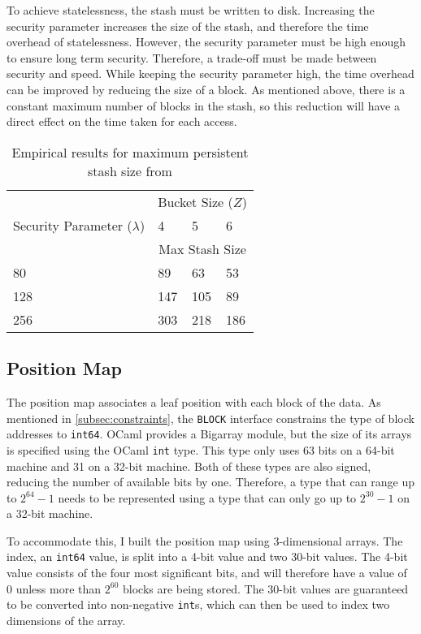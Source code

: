 \documentclass[12pt,a4paper,twoside,openright]{report}
\begin{document}
To achieve statelessness, the stash must be written to disk. Increasing the security parameter increases the size of the stash, and therefore the time overhead of statelessness. However, the security parameter must be high enough to ensure long term security. Therefore, a trade-off must be made between security and speed. While keeping the security parameter high, the time overhead can be improved by reducing the size of a block. As mentioned above, there is a constant maximum number of blocks in the stash, so this reduction will have a direct effect on the time taken for each access.

\begin{table}
\centering
\begin{tabular}{|l|l|l|l|}
    \hline
    & \multicolumn{3}{c|}{Bucket Size ($Z$)} \\
    \cline{2-4}
    Security Parameter ($\lambda$) & 4 & 5 & 6 \\
    \cline{2-4}
    & \multicolumn{3}{c|}{Max Stash Size} \\
    \hline
    80 & 89 & 63 & 53 \\
    \hline
    128 & 147 & 105 & 89 \\
    \hline
    256 & 303 & 218 & 186 \\
    \hline
\end{tabular}
\caption{Empirical results for maximum persistent stash size from \citet{stefanov2013path}}
\label{tab:stashsizes}
\end{table}

\subsection{Position Map}

The position map associates a leaf position with each block of the data. As mentioned in \cref{subsec:constraints}, the \texttt{BLOCK} interface constrains the type of block addresses to \texttt{int64}. OCaml provides a Bigarray module, but the size of its arrays is specified using the OCaml \texttt{int} type. This type only uses 63 bits on a 64-bit machine and 31 on a 32-bit machine. Both of these types are also signed, reducing the number of available bits by one. Therefore, a type that can range up to $2^{64} - 1$ needs to be represented using a type that can only go up to $2^{30} - 1$ on a 32-bit machine.

To accommodate this, I built the position map using 3-dimensional arrays. The index, an \texttt{int64} value, is split into a 4-bit value and two 30-bit values. The 4-bit value consists of the four most significant bits, and will therefore have a value of 0 unless more than $2^{60}$ blocks are being stored. The 30-bit values are guaranteed to be converted into non-negative \texttt{int}s, which can then be used to index two dimensions of the array.
\end{document}
